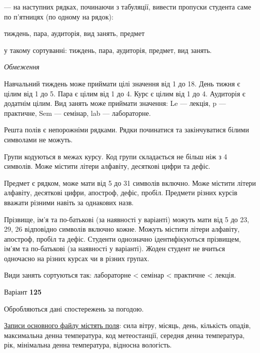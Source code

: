 \documentclass[11pt, ukrainian]{article}
\begin{document}
{\noindent}--- на наступних рядках, починаючи з табуляції, вивести пропуски студента саме по п’ятницях (по одному на рядок):\par
тиждень, пара, аудиторія, вид занять, предмет

{\noindent}у такому сортуванні: тиждень, пара, аудиторія, предмет, вид занять.


\bigskip\textit{Обмеження}

Навчальний тиждень може приймати цілі значення від 1 до 18.
День тижня є цілим від 1 до 5. Пара є цілим від 1 до 4.
Курс є цілим від 1 до 4. Аудиторія є додатнім цілим.
Вид занять може приймати значення:
Le --- лекція, p --- практичне, Sem --- семінар, lab --- лабораторне.

Решта полів є непорожніми рядками.
Рядки починатися та закінчуватися білими символами не можуть.

Групи кодуються в межах курсу.
Код групи складається не більш ніж з 4 символів.
Може містити літери алфавіту, десяткові цифри та дефіс.

Предмет є рядком, може мати від 5 до 31 символів включно.
Може містити літери алфавіту, десяткові цифри, апостроф, дефіс, пробіл.
Предмети різних курсів вважати різними навіть за однакових назв.

Прізвище, ім’я та по-батькові (за наявності у варіанті)
можуть мати від 5 до 23, 29, 26 відповідно символів включно кожне.
Можуть містити літери алфавіту, апостроф, пробіл та дефіс.
Студенти однозначно ідентифікуються прізвищем, ім’ям та по-батькові (за наявності у варіанті).
Жоден студент не вчиться одночасно на різних курсах чи в різних групах.

Види занять сортуються так: лабораторне < семінар < практичне < лекція.





\par
\newpage
{\center Варіант  \No \textbf { 125 }\par}
\bigskip
Обробляються дані спостережень за погодою. 

\underline{Записи основного файлу містять поля}: сила вітру, місяць, день, кількість опадів, максимальна денна температура, код метеостанції, середня денна температура, рік, мінімальна денна температура, відносна вологість.
\end{document}
